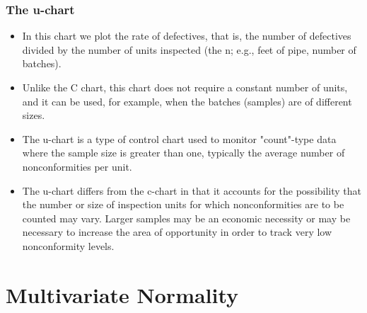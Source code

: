 \documentclass[]{report}
\begin{document}
\subsection{The u-chart}
\begin{itemize}
	\item In this chart we plot the rate of defectives, that is, the number of defectives divided by the number of units inspected (the n; e.g., feet of pipe, number of batches). 
	\item Unlike the C chart, this chart does not require a constant number of units, and it can be used, for example, when the batches (samples) are of different sizes.
	
	\item The u-chart is a type of control chart used to monitor "count"-type data where the sample size is greater than one, typically the average number of nonconformities per unit.
	
	\item The u-chart differs from the c-chart in that it accounts for the possibility that the number or size of inspection units for which nonconformities are to be counted may vary. Larger samples may be an economic necessity or may be necessary to increase the area of opportunity in order to track very low nonconformity levels.
\end{itemize}


\chapter{Multivariate Normality}
\end{document}
